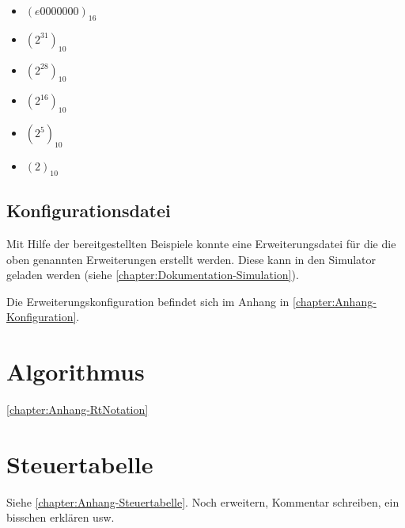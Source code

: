 \begin{itemize}
    \item $(e0000000)_{16}$
    \item $(2^{31})_{10}$
    \item $(2^{28})_{10}$
    \item $(2^{16})_{10}$
    \item $(2^5)_{10}$
    \item $(2)_{10}$
\end{itemize}

\subsection{Konfigurationsdatei}
\label{subsection:Dokumentation-Implementierung-Hardwareerweiterung-Konfigurationsdatei}

Mit Hilfe der bereitgestellten Beispiele konnte eine Erweiterungsdatei für die die oben genannten Erweiterungen erstellt werden. Diese kann in den Simulator geladen werden (siehe \autoref{chapter:Dokumentation-Simulation}).

Die Erweiterungskonfiguration befindet sich im Anhang in \autoref{chapter:Anhang-Konfiguration}.

\section{Algorithmus}
\label{section:Dokumentation-Implementierung-Algorithmus}

\autoref{chapter:Anhang-RtNotation}

\section{Steuertabelle}
\label{section:Dokumentation-Implementierung-Steuertabelle}

Siehe \autoref{chapter:Anhang-Steuertabelle}. Noch erweitern, Kommentar schreiben, ein bisschen erklären usw.
